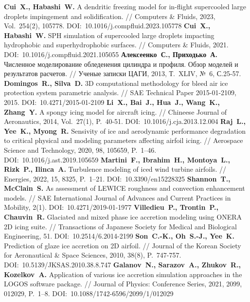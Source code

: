 \begin{thebibliography}{99}
%
\textbf{Cui~X., Habashi~W.} A dendritic freezing model for in-flight supercooled large droplets impingement and solidification. // Computers \& Fluids, 2023, Vol.~254(2), 105778. DOI:~10.1016/j.compfluid.2023.105778
%
\textbf{Cui~X., Habashi~W.} SPH simulation of supercooled large droplets impacting hydrophobic and superhydrophobic surfaces. // Computers \& Fluids, 2021. DOI:~10.1016/j.compfluid.2021.105055
%
\textbf{Алексеенко~С., Приходько~А.} Численное моделирование обледенения цилиндра и профиля. Обзор моделей и результатов расчетов. // Ученые записки ЦАГИ, 2013, Т.~XLIV, №~6, С.25-57.
%
\textbf{Domingos~R., Silva~D.} 3D computational methodology for bleed air ice protection system parametric analysis. // SAE Technical Paper 2015-01-2109, 2015. DOI:~10.4271/2015-01-2109
%
\textbf{Li~X., Bai~J., Hua~J., Wang~K., Zhang~Y.} A spongy icing model for aircraft icing. // Chineese Journal of Aeronautics, 2014, Vol.~27(1), P.~40-51. DOI:~10.1016/j.cja.2013.12.004
%
\textbf{Raj~L., Yee~K., Myong~R.} Sensivity of ice and aerodynamic performance degradation to critical physical and modeling parameters affecting airfoil icing. // Aerospace Science and Technology, 2020, 98, 105659, P.~1–46. DOI:~10.1016/j.ast.2019.105659
%
\textbf{Martini~F., Ibrahim~H., Montoya~L., Rizk~P., Ilinca~A.} Turbulence modeling of iced wind turbine airfoils. // Energies, 2022, 15, 8325, P.~1–21. DOI:~10.3390/en15228325
%
\textbf{Shannon~T., McClain~S.} As assessment of LEWICE roughness and convection enhancement models. // SAE International Journal of Advances and Current Practices in Mobility, 2(1). DOI:~10.4271/2019-01-1977
%
\textbf{Villedieu~P., Trontin~P., Chauvin~R.} Glaciated and mixed phase ice accretion modeling using ONERA 2D icing suite. // Transactions of Japanese Society for Medical and Biological Engineering, 51. DOI:~10.2514/6.2014-2199
%
\textbf{Son~C.-K., Oh~S.-J., Yee~K.} Prediction of glaze ice accretion on 2D airfoil. // Journal of the Korean Society for Aeronautical \& Space Sciences, 2010, 38(8), P.~747-757. DOI:~10.5139/JKSAS.2010.38.8.747
%
\textbf{Galanov~N., Sarazov~A., Zhukov~R., Kozelkov~A.} Application of various ice accretion simulation approaches in the LOGOS software package. // Journal of Physics: Conference Series, 2021, 2099, 012029, P.~1–8. DOI:~10.1088/1742-6596/2099/1/012029

\end{thebibliography}
